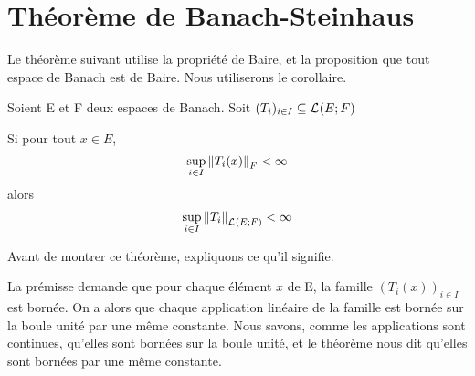 \chapter{Théorème de Banach-Steinhaus}

Le théorème suivant utilise la propriété de Baire, et la proposition que tout
espace de Banach est de Baire. Nous utiliserons le corollaire.

\begin{theorem} 
	Soient E et F deux espaces de Banach.
	Soit $(T_{i})_{i \in I} \subseteq \mathcal{L}_{}(E; F)$
	\label{banach-steinhaus}

	Si pour tout $x \in E$,
	\begin{equation}
		\sup_{i \in I} \norm{T_{i}(x)}_{F} < \infty
	\end{equation}
	alors
	\begin{equation}
		\sup_{i \in I} \norm{T_{i}}_{\mathcal{L}_{}(E; F)} < \infty
	\end{equation}
\end{theorem}

Avant de montrer ce théorème, expliquons ce qu'il signifie.

La prémisse demande que pour chaque élément $x$ de E, la famille $(T_{i}(x))_{i
\in I}$ est bornée.
On a alors que chaque application linéaire de la famille est bornée sur la
boule unité par une même constante. Nous savons, comme les applications sont
continues, qu'elles sont bornées sur la boule unité, et le théorème nous dit
qu'elles sont bornées par une même constante.

